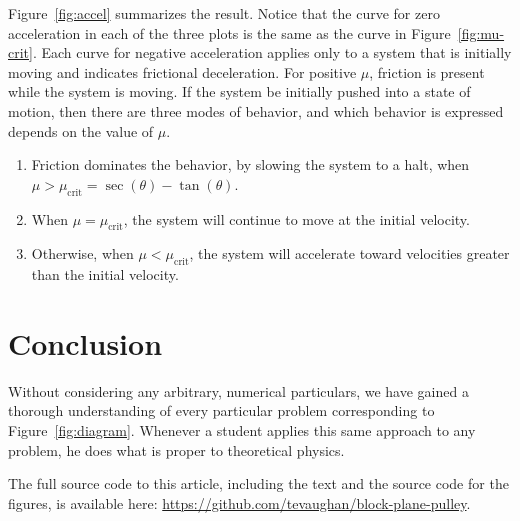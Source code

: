 \documentclass[twocolumn]{article}
\begin{document}
Figure~\ref{fig:accel} summarizes the result. Notice that the curve for zero
acceleration in each of the three plots is the same as the curve in
Figure~\ref{fig:mu-crit}. Each curve for negative acceleration applies only to
a system that is initially moving and indicates frictional deceleration. For
positive $\mu$, friction is present while the system is moving. If the system
be initially pushed into a state of motion, then there are three modes of
behavior, and which behavior is expressed depends on the value of $\mu$.
\begin{enumerate}
   \item Friction dominates the behavior, by slowing the system to a halt, when
      $\mu > \mu_\text{crit} = \sec(\theta) - \tan(\theta)$.
   \item When $\mu = \mu_\text{crit}$, the system will continue to move at the
      initial velocity.
   \item Otherwise, when $\mu < \mu_\text{crit}$, the system will accelerate
      toward velocities greater than the initial velocity.
\end{enumerate}

\section{Conclusion}

Without considering any arbitrary, numerical particulars, we have gained a
thorough understanding of every particular problem corresponding to
Figure~\ref{fig:diagram}.  Whenever a student applies this same approach to any
problem, he does what is proper to theoretical physics.

The full source code to this article, including the text and the source code
for the figures, is available here:
\url{https://github.com/tevaughan/block-plane-pulley}.

\newpage


\end{document}
